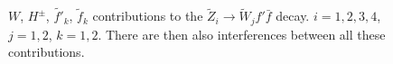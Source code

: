 \documentclass[final,3p,times]{elsarticle}
\begin{document}
\begin{figure}
  \caption{$W$, $H^{\pm}$, $\tilde{f'}_k$, $\tilde{f}_k$ contributions to the $\tilde{Z}_i \rightarrow \tilde{W}_j f' \bar{f}$ decay. $i=1,2,3,4$, $j=1,2$, $k=1,2$. There are then also interferences between all these contributions.} \label{neutcharfeyn3}
\end{figure} 
\end{document}

